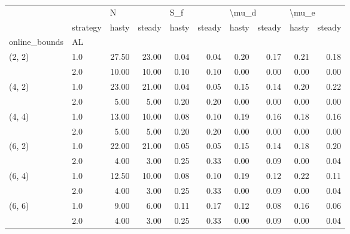 \begin{tabular}{llrrrrrrrr}
\toprule
       & {} & \multicolumn{2}{l}{N} & \multicolumn{2}{l}{S\_f} & \multicolumn{2}{l}{\textbackslash mu\_d} & \multicolumn{2}{l}{\textbackslash mu\_e} \\
       & strategy & hasty & steady & hasty & steady & hasty & steady & hasty & steady \\
online\_bounds & AL &       &        &       &        &       &        &       &        \\
\midrule
(2, 2) & 1.0 & 27.50 &  23.00 &  0.04 &   0.04 &  0.20 &   0.17 &  0.21 &   0.18 \\
       & 2.0 & 10.00 &  10.00 &  0.10 &   0.10 &  0.00 &   0.00 &  0.00 &   0.00 \\
(4, 2) & 1.0 & 23.00 &  21.00 &  0.04 &   0.05 &  0.15 &   0.14 &  0.20 &   0.22 \\
       & 2.0 &  5.00 &   5.00 &  0.20 &   0.20 &  0.00 &   0.00 &  0.00 &   0.00 \\
(4, 4) & 1.0 & 13.00 &  10.00 &  0.08 &   0.10 &  0.19 &   0.16 &  0.18 &   0.16 \\
       & 2.0 &  5.00 &   5.00 &  0.20 &   0.20 &  0.00 &   0.00 &  0.00 &   0.00 \\
(6, 2) & 1.0 & 22.00 &  21.00 &  0.05 &   0.05 &  0.15 &   0.14 &  0.18 &   0.20 \\
       & 2.0 &  4.00 &   3.00 &  0.25 &   0.33 &  0.00 &   0.09 &  0.00 &   0.04 \\
(6, 4) & 1.0 & 12.50 &  10.00 &  0.08 &   0.10 &  0.19 &   0.12 &  0.22 &   0.11 \\
       & 2.0 &  4.00 &   3.00 &  0.25 &   0.33 &  0.00 &   0.09 &  0.00 &   0.04 \\
(6, 6) & 1.0 &  9.00 &   6.00 &  0.11 &   0.17 &  0.12 &   0.08 &  0.16 &   0.06 \\
       & 2.0 &  4.00 &   3.00 &  0.25 &   0.33 &  0.00 &   0.09 &  0.00 &   0.04 \\
\bottomrule
\end{tabular}
